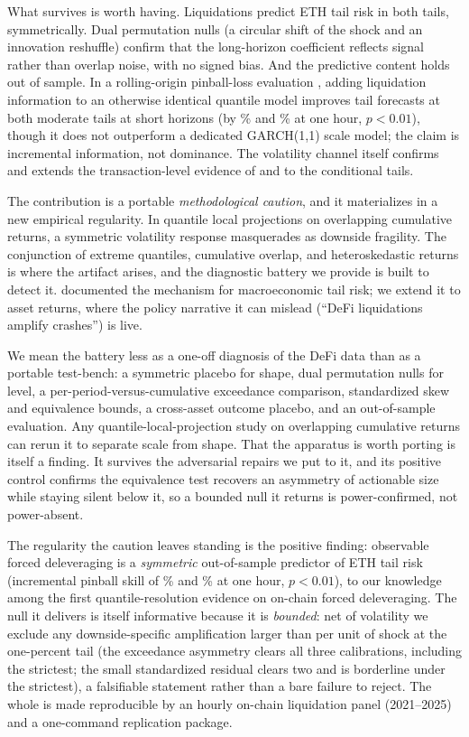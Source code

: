 What survives is worth having. Liquidations predict ETH
tail risk in both tails, symmetrically. Dual permutation nulls (a
circular shift of the shock and an innovation reshuffle) confirm that the
long-horizon coefficient reflects signal rather than overlap noise,
with no signed bias. And the predictive content holds out of sample. In a
rolling-origin pinball-loss evaluation \citep{diebold1995}, adding
liquidation information to an otherwise identical quantile model improves
tail forecasts at both moderate tails at short horizons
(by \OosSkillFiveHone\% and \OosSkillNinetyFiveHone\% at one hour,
$p < 0.01$), though it does not outperform a dedicated GARCH(1,1) scale
model; the claim is incremental information, not dominance. The
volatility channel itself confirms and extends the transaction-level evidence
of \citet{oecd2023} and \citet{lehar2022} to the conditional tails.

The contribution is a portable \emph{methodological caution}, and it
materializes in a new empirical regularity. In quantile local
projections on overlapping cumulative returns, a symmetric volatility
response masquerades as downside fragility. The conjunction of extreme
quantiles, cumulative overlap, and heteroskedastic returns is where the
artifact arises, and the diagnostic battery we provide is built to detect
it. \citet{carriero2024} documented the mechanism for macroeconomic tail
risk; we extend it to asset returns, where the policy narrative it can
mislead (``DeFi liquidations amplify crashes'') is live.

We mean the battery less as a one-off diagnosis of the DeFi data than as a
portable test-bench: a symmetric placebo for shape, dual permutation
nulls for level, a per-period-versus-cumulative exceedance comparison,
standardized skew and equivalence bounds, a cross-asset outcome placebo, and
an out-of-sample evaluation. Any quantile-local-projection study on
overlapping cumulative returns can rerun it to separate scale from shape. That
the apparatus is worth porting is itself a finding. It survives the
adversarial repairs we put to it, and its positive control confirms the
equivalence test recovers an asymmetry of actionable size while
staying silent below it, so a bounded null it returns is power-confirmed,
not power-absent.

The
regularity the caution leaves standing is the positive finding: observable
forced deleveraging is a \emph{symmetric} out-of-sample predictor
of ETH tail risk (incremental pinball skill of \OosSkillFiveHone\% and
\OosSkillNinetyFiveHone\% at one hour, $p < 0.01$), to our knowledge among the first quantile-resolution evidence on on-chain forced deleveraging. The
null it delivers is itself informative because it is \emph{bounded}: net of
volatility we exclude any downside-specific amplification larger than
\MdeEightyExc{} per unit of shock at the one-percent tail (the exceedance
asymmetry clears all three calibrations, including the strictest; the small
standardized residual clears two and is borderline under the strictest), a
falsifiable statement rather than a bare failure to reject. The whole is made reproducible by an hourly
on-chain liquidation panel (2021--2025) and a one-command replication
package.

